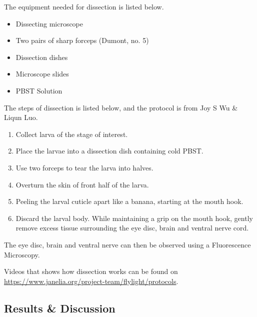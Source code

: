 The equipment needed for dissection is listed below.

\begin{itemize}
    \item Dissecting microscope
    \item Two pairs of sharp forceps (Dumont, no. 5)
    \item Dissection dishes
    \item Microscope slides
    \item PBST Solution
\end{itemize}

The steps of dissection is listed below, and the protocol is from Joy S Wu \& Liqun Luo.

\begin{enumerate}
    \item Collect larva of the stage of interest.
    \item Place the larvae into a dissection dish containing cold PBST.
    \item Use two forceps to tear the larva into halves.
    \item Overturn the skin of front half of the larva.
    \item Peeling the larval cuticle apart like a banana, starting at the mouth hook. 
    \item Discard the larval body. While maintaining a grip on the mouth hook, gently remove excess tissue surrounding the eye disc, brain and ventral nerve cord.
\end{enumerate}

The eye disc, brain and ventral nerve can then be observed using a Fluorescence Microscopy.

Videos that shows how dissection works can be found on \url{https://www.janelia.org/project-team/flylight/protocols}.
\subsection{Results \& Discussion}

